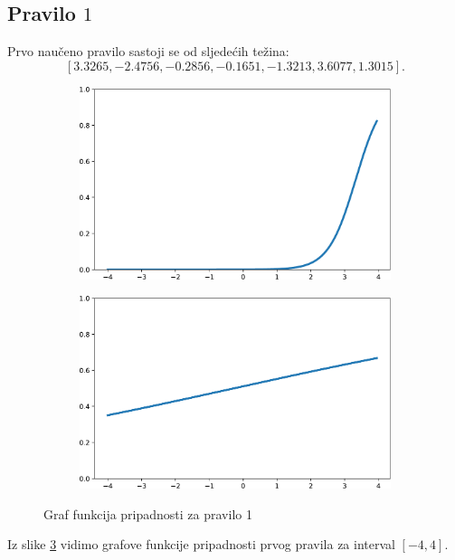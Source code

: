 \documentclass[12pt, a4paper, numeric]{article}
\begin{document}
\subsection{Pravilo $1$}
Prvo naučeno pravilo sastoji se od sljedećih težina: 
\[[3.3265, -2.4756, -0.2856, -0.1651, -1.3213, 3.6077, 1.3015].\]
\begin{figure}[th!]
    \centering
    \begin{subfigure}{.5\textwidth}
        \centering
        \includegraphics[width=.9\linewidth]{img/A1}
        \captionsetup{justification=centering}
        \caption{}
        \label{fig:a1}
    \end{subfigure}%
    \begin{subfigure}{.5\textwidth}
        \centering
        \includegraphics[width=.9\linewidth]{img/B1}
        \captionsetup{justification=centering}
        \caption{}
        \label{fig:b1}
    \end{subfigure}
    \caption{Graf funkcija pripadnosti za pravilo 1}
    \label{fig:pripasdnost1}
\end{figure}
Iz slike \ref{fig:pripasdnost1} vidimo grafove funkcije pripadnosti prvog pravila za interval $[-4, 4]$.
\end{document}
